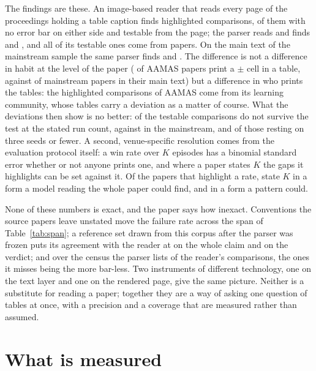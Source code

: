 \documentclass[sigconf,anonymous]{aamas}
\begin{document}
The findings are these. An image-based reader that reads every page of the
proceedings holding a table caption finds \nCzGroups{} highlighted
comparisons, \nCzNeither{} of them with no error bar on either side and
\nCzTestable{} testable from the page; the parser reads \nAComparisons{}
and finds \nAPctNeither{} and \nAPctTestable{}, and all of its testable
ones come from \nAPapersTestable{} papers. On the main text of the mainstream sample
the same parser finds \nMlMainNeither{} and \nMlMainTestable{}. The
difference is not a difference in habit at the level of the paper
(\nAPctPapersErr{} of AAMAS papers print a $\pm$ cell in a table, against
\nMlMainPapersErr{} of mainstream papers in their main text) but a
difference in who prints the tables: the highlighted comparisons of AAMAS
come from its learning community, whose tables carry a deviation as a matter
of course. What the deviations then show is no better: \nAPctFail{} of the
testable comparisons do not survive the test at the stated run count,
against \nMlMainFail{} in the mainstream, and \nRunsLeThreeFail{} of those
resting on three seeds or fewer. A second, venue-specific resolution comes
from the evaluation protocol itself: a win rate over $K$ episodes has a
binomial standard error whether or not anyone prints one, and where a paper
states $K$ the gaps it highlights can be set against it. Of the
\nRatePapers{} papers that highlight a rate, \nPrdReaderK{} state $K$ in a
form a model reading the whole paper could find, and \nPrdRegexK{} in a
form a pattern could.

None of these numbers is exact, and the paper says how inexact. Conventions
the source papers leave unstated move the failure rate across the span of
Table~\ref{tab:span}; a reference set drawn from this corpus after the
parser was frozen puts its agreement with the reader at \nGClaim{} on the
whole claim and \nGVerdict{} on the verdict; and over the census the parser
lists \nCzReaderFoundPct{} of the reader's comparisons, the ones it misses
being the more bar-less. Two instruments of different technology, one on
the text layer and one on the rendered page, give the same picture. Neither
is a substitute for reading a paper; together they are a way of asking one
question of \nCzTables{} tables at once, with a precision and a coverage
that are measured rather than assumed.

\section{What is measured}
\label{sec:what}
\end{document}

